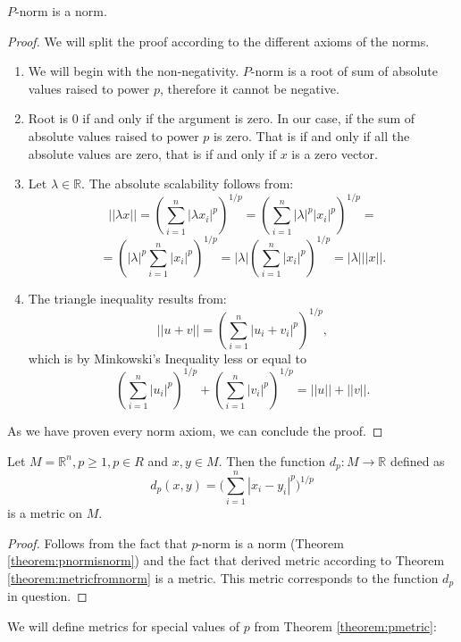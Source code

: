 	\begin{theorem}
		\label{theorem:pnormisnorm}
		$P$-norm is a norm.
		\begin{proof}
			We will split the proof according to the different axioms of the norms.
			\begin{enumerate}
				\item We will begin with the non-negativity. $P$-norm is a root of sum of absolute values raised to power $p$, therefore it cannot be negative.
				\item Root is 0 if and only if the argument is zero. In our case, if the sum of absolute values raised to power $p$ is zero. That is if and only if all the absolute values are zero, that is if and only if $x$ is a zero vector.
				\item Let $\lambda \in \mathbb{R}$. The absolute scalability follows from: $$||\lambda x||={\left( \sum_{i=1}^{n}|\lambda x_i|^p \right)}^{1/p} = {\left( \sum_{i=1}^{n}|\lambda|^p|x_i|^p \right)}^{1/p}=$$
				$$={\left(|\lambda|^p \sum_{i=1}^{n}|x_i|^p \right)}^{1/p} = |\lambda|{\left( \sum_{i=1}^{n}|x_i|^p \right)}^{1/p} = |\lambda|||x||. $$ 
				\item The triangle inequality results from:	 
				$$||u+v|| = {\left( \sum_{i=1}^{n}|u_i+v_i|^p \right)}^{1/p},$$
				which is by Minkowski's Inequality less or equal to  $${\left( \sum_{i=1}^{n}|u_i|^p \right)}^{1/p} + {\left( \sum_{i=1}^{n}|v_i|^p \right)}^{1/p} = ||u||+||v||.$$
			\end{enumerate}
			As we have proven every norm axiom, we can conclude the proof.
		\end{proof}
	\end{theorem}
	\begin{theorem}
		\label{theorem:pmetric}
		Let $M = \mathbb{R}^n, p \ge 1, p \in R$ and $x,y \in M$. Then the function $d_p: M \rightarrow \mathbb{R}$ defined as
		\begin{equation}
		d_p(x,y) = \big( \sum_{i=1}^{n}|x_i - y_i|^p \big) ^ {1/p}
		\end{equation}
		is a metric on $M$.
		\begin{proof}
			Follows from the fact that $p$-norm is a norm (Theorem \ref{theorem:pnormisnorm}) and the fact that derived metric according to Theorem \ref{theorem:metricfromnorm} is a metric. This metric corresponds to the function $d_p$ in question.
		\end{proof}
	\end{theorem}
	We will define metrics for special values of $p$ from Theorem \ref{theorem:pmetric}:
